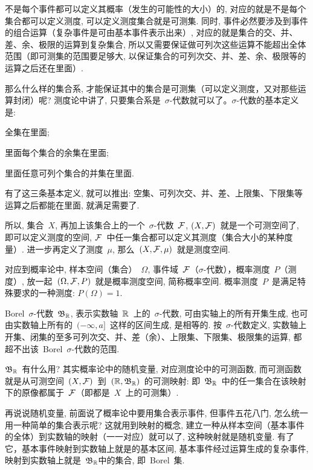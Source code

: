 不是每个事件都可以定义其概率（发生的可能性的大小）的, 对应的就是不是每个集合都可以定义测度, 可以定义测度集合就是可测集. 同时, 事件必然要涉及到事件的组合运算（复杂事件是可由基本事件表示出来）, 对应的就是集合的交、并、差、余、极限的运算到复杂集合, 所以又需要保证做可列次这些运算不能超出全体范围（即可测集的范围要足够大, 以保证集合的可列次交、并、差、余、极限等的运算之后还在里面）.

那么什么样的集合系, 才能保证其中的集合是可测集（可以定义测度，又对那些运算封闭）呢? 测度论中讲了, 只要集合系是~$\sigma$-代数就可以了。$\sigma$-代数的基本定义是: 

\begin{publist}
	\item[(1)] 全集在里面; 
	
	\item[(2)] 里面每个集合的余集在里面; 
	
	\item[(3)] 里面任意可列个集合的并集在里面.
\end{publist}

\noindent 有了这三条基本定义, 就可以推出: 空集、可列次交、并、差、上限集、下限集等运算之后都能在里面, 就满足需要了.

所以, 集合~$X$, 再加上该集合上的一个~$\sigma$-代数~$\mathcal{F}$, $(X, \mathcal{F})$~就是一个可测空间了, 即可以定义测度的空间, $\mathcal{F}$~中任一集合都可以定义其测度（集合大小的某种度量）. 进一步再定义了测度~$\mu$, 那么~$(X,\mathcal{F},\mu)$~就是测度空间.

对应到概率论中, 样本空间（集合）~$\Omega$, 事件域~$\mathcal{F}$（$\sigma$-代数），概率测度~$P$（测度）, 放一起~$(\Omega,\mathcal{F},P)$~就是概率测度空间, 简称概率空间. 概率测度~$P$~是满足特殊要求的一种测度: $P(\Omega)=1$.

Borel~$\sigma$-代数~$\mathfrak{B}_{\mathbb{R}}$, 表示实数轴~$\mathbb{R}$~上的~$\sigma$-代数, 可由实轴上的所有开集生成, 也可由实数轴上所有的~$(-\infty,a]$~这样的区间生成, 是相等的. 按~$\sigma$-代数定义, 实数轴上开集、闭集的至多可列次交、并、差（余）、上限集、下限集、极限集的运算, 都超不出该~Borel~$\sigma$-代数的范围.

$\mathfrak{B}_{\mathbb{R}}$~有什么用? 其实概率论中的随机变量, 对应测度论中的可测函数, 而可测函数就是从可测空间~$(X,\mathcal{F})$~到~$(\mathbb{R}, \mathfrak{B}_{\mathbb{R}})$~的可测映射: 即~$\mathfrak{B}_{\mathbb{R}}$~中的任一集合在该映射下的原像都属于~$\mathcal{F}$（即都是~$X$~上的可测集）.

再说说随机变量, 前面说了概率论中要用集合表示事件, 但事件五花八门, 怎么统一用一种简单的集合表示呢? 这就用到映射的概念, 建立一种从样本空间（基本事件的全体）到实数轴的映射（一一对应）就可以了, 这种映射就是随机变量. 有了它，基本事件映射到实数轴上就是的基本区间, 基本事件经过运算生成的复杂事件, 映射到实数轴上就是~$\mathfrak{B}_{\mathbb{R}}$中的集合, 即~Borel~集. 

